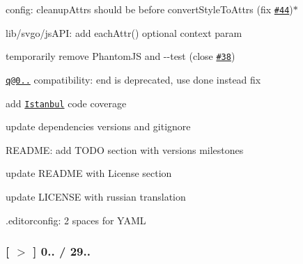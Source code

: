 \begin{DoxyItemize}
\item config\+: {\ttfamily cleanup\+Attrs} should be before {\ttfamily convert\+Style\+To\+Attrs} (fix \href{https://github.com/svg/svgo/issues/44}{\tt \#44})$\ast$
\item lib/svgo/js\+A\+PI\+: add {\ttfamily each\+Attr()} optional context param
\item temporarily remove Phantom\+JS and {\ttfamily -\/-\/test} (close \href{https://github.com/svg/svgo/issues/38}{\tt \#38})
\item \href{mailto:q@0.8.10}{\tt q@0..} compatibility\+: \textquotesingle{}end is deprecated, use done instead\textquotesingle{} fix
\item add \href{https://github.com/gotwarlost/istanbul}{\tt Istanbul} code coverage
\item update dependencies versions and gitignore
\item R\+E\+A\+D\+ME\+: add T\+O\+DO section with versions milestones
\item update R\+E\+A\+D\+ME with License section
\item update L\+I\+C\+E\+N\+SE with russian translation
\item {\ttfamily .editorconfig}\+: 2 spaces for Y\+A\+ML
\end{DoxyItemize}

\subsubsection*{\mbox{[} \href{https://github.com/svg/svgo/tree/v0.0.9}{\tt $>$} \mbox{]} 0.. / 29..}


